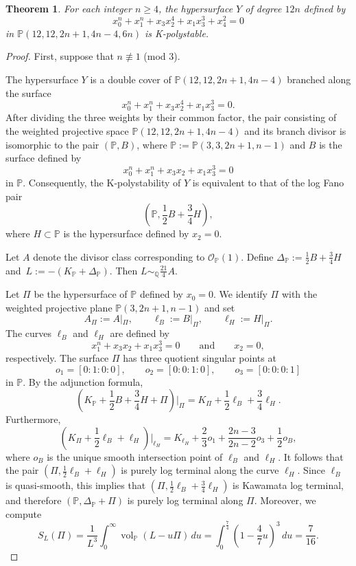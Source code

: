 \documentclass[10pt,a4paper]{amsart}
\newtheorem{theorem}{Theorem}
\begin{document}
\begin{theorem}\label{theorem:h}
For each integer $n\geq 4$,  the hypersurface $Y$ of degree $12n$  defined by 
\[x_0^{n}+x_1^{n}+x_3x_2^4+x_1x_3^3+x_4^2=0\]
in $\mathbb{P}(12,12,2n+1,4n-4,6n)$
is K-polystable.
\end{theorem}

\begin{proof}
First, suppose that $n\not\equiv 1$ (mod $3$). 

The hypersurface $Y$ is a double cover of $\mathbb{P}(12,12,2n+1,4n-4)$ branched along the surface
\[
x_0^{n}+x_1^{n}+x_3x_2^4+x_1x_3^3=0.
\]
After dividing the three weights by their common factor, the pair consisting of the weighted projective space $\mathbb{P}(12,12,2n+1,4n-4)$ and its branch divisor is isomorphic to the pair $(\mathbb{P},B)$, where
$
\mathbb{P}:=\mathbb{P}(3,3,2n+1,n-1)$
and $B$ is the surface defined by
\[
x_0^{n}+x_1^{n}+x_3x_2+x_1x_3^3=0
\]
in $\mathbb{P}$.
Consequently, the K-polystability of $Y$ is equivalent to that of the log Fano pair
\[
\left(\mathbb{P}, \frac{1}{2}B+\frac{3}{4}H\right),
\]
where $H\subset \mathbb{P}$ is the hypersurface defined by $x_2=0$.



Let $A$ denote the divisor class corresponding to $\mathcal{O}_{\mathbb{P}}(1)$. Define
$\Delta_{\mathbb{P}}:=\frac{1}{2}B+\frac{3}{4}H$ and~$L:=-\left(K_{\mathbb{P}}+\Delta_{\mathbb{P}}\right)$.
Then
$
L\sim_{\mathbb{Q}}\frac{21}{4}A$.

Let $\Pi$  be the hypersurface of $\mathbb{P}$ defined by $x_0=0$. We identify $\Pi$ with the weighted projective plane $\mathbb{P}(3,2n+1,n-1)$ and set
\[
A_{\Pi}:=A|_{\Pi}, \qquad
\ell_B:=B|_{\Pi}, \qquad
\ell_H:=H|_{\Pi}.
\]
The curves $\ell_B$ and $\ell_H$ are defined by
\[
x_1^{n}+x_3x_2+x_1x_3^3=0
\qquad\text{and}\qquad
x_2=0,
\]
respectively. The surface $\Pi$ has three quotient singular points at
\[
o_1=[0:1:0:0], \qquad
o_2=[0:0:1:0], \qquad
o_3=[0:0:0:1]
\]
in $\mathbb{P}$.
By the adjunction formula,
\[
\left(K_{\mathbb{P}}+\frac{1}{2}B+\frac{3}{4}H+\Pi\right)\Big|_{\Pi}
=
K_{\Pi}+\frac{1}{2}\ell_B+\frac{3}{4}\ell_H.
\]
Furthermore,
\begin{equation}\label{eq:G2-LH}
\left(K_{\Pi}+\frac{1}{2}\ell_B+\ell_H\right)\Big|_{\ell_H}
=
K_{\ell_H}
+\frac{2}{3}o_1
+\frac{2n-3}{2n-2}o_3
+\frac{1}{2}o_B,
\end{equation}
where $o_B$ is the unique smooth intersection point of $\ell_B$ and $\ell_H$. It follows that the pair
$
\left(\Pi,\frac{1}{2}\ell_B+\ell_H\right)
$
is purely log terminal along the curve $\ell_H$. Since $\ell_B$ is quasi-smooth, this implies that 
$
\left(\Pi,\frac{1}{2}\ell_B+\frac{3}{4}\ell_H\right)
$
is Kawamata log terminal, and therefore
$
(\mathbb{P},\Delta_{\mathbb{P}}+\Pi)
$
is purely log terminal along $\Pi$.
Moreover, we compute
\[
S_L(\Pi)
=
\frac{1}{L^3}
\int_{0}^{\infty}
\operatorname{vol}_{\mathbb{P}}(L-u\Pi)\,du
=
\int_{0}^{\frac{7}{4}}
\left(1-\frac{4}{7}u\right)^3\,du
=
\frac{7}{16}.
\]




\end{proof}
\end{document}
